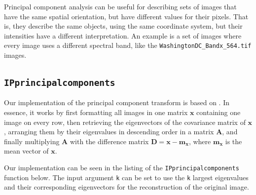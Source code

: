 Principal component analysis can be useful for describing sets of images that have the same spatial orientation, but have different values for their pixels.
That is, they describe the same objects, using the same coordinate system, but their intensities have a different interpretation.
An example is a set of images where every image uses a different spectral band, like the \texttt{WashingtonDC\_Bandx\_564.tif} images.

\subsection{\texttt{IPprincipalcomponents}}
Our implementation of the principal component transform is based on \cite[Sec. 11.4]{gonzalez2002digital}.
In essence, it works by first formatting all images in one matrix \(\mathbf{x}\) containing one image on every row, then retrieving the eigenvectors of the covariance matrix of \(\mathbf{x}\), arranging them by their eigenvalues in descending order in a matrix \(\mathbf{A}\), and finally multiplying \(\mathbf{A}\) with the difference matrix \(\mathbf{D} = \mathbf{x} - \mathbf{m_x}\), where \(\mathbf{m_x}\) is the mean vector of \(\mathbf{x}\).

Our implementation can be seen in the listing of the \texttt{IPprincipalcomponents} function below.
The input argument \texttt{k} can be set to use the \texttt{k} largest eigenvalues and their corresponding eigenvectors for the reconstruction of the original image.

